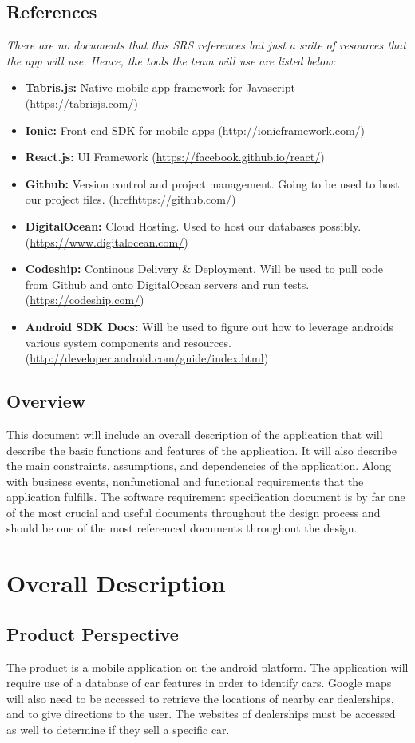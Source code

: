 \documentclass[12pt]{article}
\begin{document}
\subsection{References}
\textit{There are no documents that this SRS references but just a suite of resources that the app will use. Hence, the tools the team will use are listed below:}
\begin{itemize}
    \item \textbf{Tabris.js:} Native mobile app framework for Javascript (\url{https://tabrisjs.com/})
    \item \textbf{Ionic:} Front-end SDK for mobile apps (\url{http://ionicframework.com/})
    \item \textbf{React.js:} UI Framework (\url{https://facebook.github.io/react/})
    \item \textbf{Github:} Version control and project management. Going to be used to host our project files. (href{https://github.com/})
    \item \textbf{DigitalOcean:} Cloud Hosting. Used to host our databases possibly. (\url{https://www.digitalocean.com/})
    \item \textbf{Codeship:} Continous Delivery \& Deployment. Will be used to pull code from Github and onto DigitalOcean servers and run tests. (\url{https://codeship.com/})
    \item \textbf{Android SDK Docs:} Will be used to figure out how to leverage androids various system components and resources. (\url{http://developer.android.com/guide/index.html})
\end{itemize}
\subsection{Overview}
This document will include an overall description of the application that will describe the basic functions and features of the application. It will also describe the main constraints, assumptions, and dependencies of the application. Along with business events, nonfunctional and functional requirements that the application fulfills. The software requirement specification document is by far one of the most crucial and useful documents throughout the design process and should be one of the most referenced documents throughout the design.

\section{Overall Description}
\subsection{Product Perspective}
The product is a mobile application on the android platform. The application will require use of a database of car features in order to identify cars. Google maps will also need to be accessed to retrieve the locations of nearby car dealerships, and to give directions to the user. The websites of dealerships must be accessed as well to determine if they sell a specific car.
\end{document}
